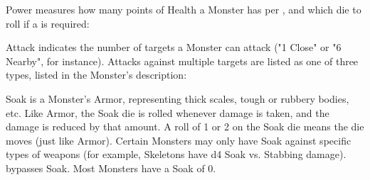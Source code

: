 {

Power measures how many points of Health a Monster has per \HD, and which die to roll if a \VIG \RB is required:



Attack indicates the number of targets a Monster can attack ("1 Close" or "6 Nearby", for instance). Attacks against multiple targets are listed as one of three types, listed in the Monster's description:




Soak is a Monster's Armor, representing thick scales, tough or rubbery bodies, etc.  Like Armor, the Soak die is rolled whenever  damage is taken, and the damage is reduced by that amount. A roll of 1 or 2 on the Soak die means the die moves \DCDOWN (just like Armor). Certain Monsters may only have Soak against specific types of weapons (for example, Skeletons have d4 Soak vs. Stabbing damage).   bypasses Soak. Most Monsters have a Soak of 0.


}
